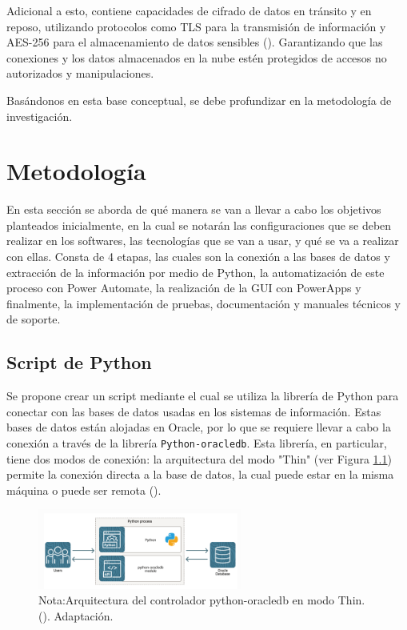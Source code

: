 \documentclass[letter,oneside,12pt,spanish]{report}
\begin{document}
\noindent Adicional a esto, contiene capacidades de cifrado de datos en tránsito y en reposo, utilizando protocolos como TLS para la transmisión de información y AES-256 para el almacenamiento de datos sensibles (\cite{microsoft2024encryption}). Garantizando que las conexiones y los datos almacenados en la nube estén protegidos de accesos no autorizados y manipulaciones.

\noindent Basándonos en esta base conceptual, se debe profundizar en la metodología de investigación.


\newpage

\chapter{Metodología}

\noindent En esta sección se aborda de qué manera se van a llevar a cabo los objetivos planteados inicialmente, en la cual se notarán las configuraciones que se deben realizar en los softwares, las tecnologías que se van a usar, y qué se va a realizar con ellas. Consta de 4 etapas, las cuales son la conexión a las bases de datos y extracción de la información por medio de Python, la automatización de este proceso con Power Automate, la realización de la GUI con PowerApps y finalmente, la implementación de pruebas, documentación y manuales técnicos y de soporte. 


\section{Script de Python}

\noindent Se propone crear un script mediante el cual se utiliza la librería de Python para conectar con las bases de datos usadas en los sistemas de información. Estas bases de datos están alojadas en Oracle, por lo que se requiere llevar a cabo la conexión a través de la librería \texttt{Python-oracledb}. Esta librería, en particular, tiene dos modos de conexión: la arquitectura del modo "Thin" (ver Figura \ref{fig:modothini}) permite la conexión directa a la base de datos, la cual puede estar en la misma máquina o puede ser remota (\cite{oracle2024python}).


\begin{figure}[ht]
    \centering
    \includegraphics[width=0.6\textwidth]{Figs/modo thin.png}
    \label{fig:modothini}
    \\Nota:Arquitectura del controlador python-oracledb en modo Thin. (\cite{oracle2024python}). Adaptación.
\end{figure}
\end{document}
